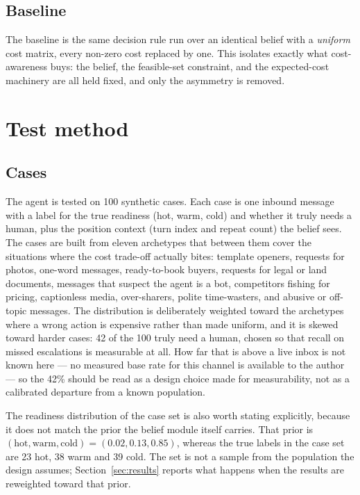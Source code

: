 \documentclass{article}
\begin{document}
\subsection{Baseline}
The baseline is the same decision rule run over an identical belief with a
\emph{uniform} cost matrix, every non-zero cost replaced by one. This isolates
exactly what cost-awareness buys: the belief, the feasible-set constraint, and
the expected-cost machinery are all held fixed, and only the asymmetry is
removed.
\section{Test method}
\label{sec:method}

\subsection{Cases}
The agent is tested on 100 synthetic cases. Each case is one inbound message with
a label for the true readiness (hot, warm, cold) and whether it truly needs a
human, plus the position context (turn index and repeat count) the belief sees.
The cases are built from eleven archetypes that between them cover the situations
where the cost trade-off actually bites: template openers, requests for photos,
one-word messages, ready-to-book buyers, requests for legal or land documents,
messages that suspect the agent is a bot, competitors fishing for pricing,
captionless media, over-sharers, polite time-wasters, and abusive or off-topic
messages. The distribution is deliberately weighted toward the archetypes where a
wrong action is expensive rather than made uniform, and it is skewed toward
harder cases: 42 of the 100 truly need a human, chosen so that recall on missed
escalations is measurable at all. How far that is above a live inbox is not known
here --- no measured base rate for this channel is available to the author --- so
the 42\% should be read as a design choice made for measurability, not as a
calibrated departure from a known population.

The readiness distribution of the case set is also worth stating explicitly,
because it does not match the prior the belief module itself carries. That prior is
$(\text{hot}, \text{warm}, \text{cold}) = (0.02, 0.13, 0.85)$, whereas the true
labels in the case set are 23 hot, 38 warm and 39 cold. The set is not a sample
from the population the design assumes; Section~\ref{sec:results} reports what
happens when the results are reweighted toward that prior.
\end{document}

